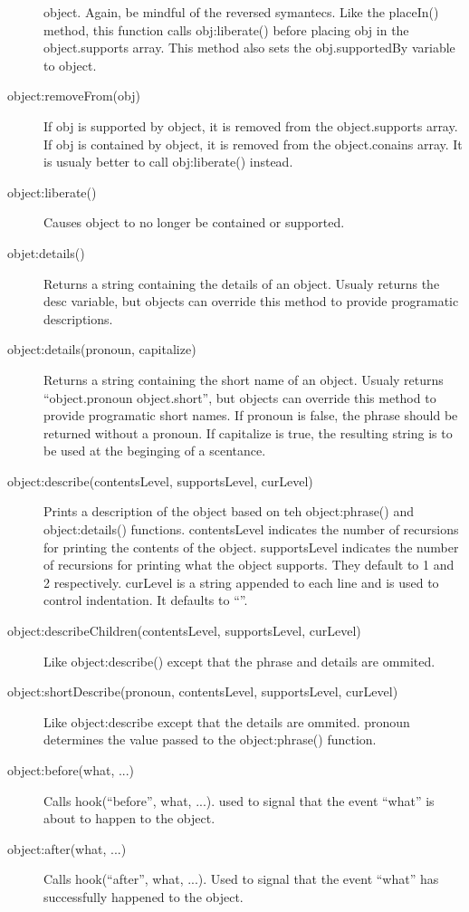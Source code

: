 \documentclass{book}
\begin{document}
\begin{description}
  object. Again, be mindful of the reversed symantecs. Like the
  placeIn() method, this function calls obj:liberate() before placing
  obj in the object.supports array. This method also sets the
  obj.supportedBy variable to object.
\item[object:removeFrom(obj)] If obj is supported by object, it is
  removed from the object.supports array. If obj is contained by
  object, it is removed from the object.conains array. It is usualy
  better to call obj:liberate() instead.
\item[object:liberate()] Causes object to no longer be contained or supported.
\item[objet:details()] Returns a string containing the details of an
  object. Usualy returns the desc variable, but objects can override
  this method to provide programatic descriptions.
\item[object:details(pronoun, capitalize)] Returns a string containing
  the short name of an object. Usualy returns ``object.pronoun
  object.short'', but objects can override this method to provide
  programatic short names. If pronoun is false, the phrase should be
  returned without a pronoun. If capitalize is true, the resulting
  string is to be used at the beginging of a scentance.
\item[object:describe(contentsLevel, supportsLevel, curLevel)] Prints
  a description of the object based on teh object:phrase() and
  object:details() functions. contentsLevel indicates the number of
  recursions for printing the contents of the object. supportsLevel
  indicates the number of recursions for printing what the object
  supports. They default to 1 and 2 respectively. curLevel is a string
  appended to each line and is used to control indentation. It
  defaults to ``''.
\item[object:describeChildren(contentsLevel, supportsLevel, curLevel)]
  Like object:describe() except that the phrase and details are
  ommited.
\item[object:shortDescribe(pronoun, contentsLevel, supportsLevel,
  curLevel)] Like object:describe except that the details are
  ommited. pronoun determines the value passed to the object:phrase()
  function.
\item[object:before(what, ...)] Calls hook(``before'', what,
  ...). used to signal that the event ``what'' is about to happen to
  the object.
\item[object:after(what, ...)] Calls hook(``after'', what, ...). Used
  to signal that the event ``what'' has successfully happened to the object.

\end{description}
\end{document}
